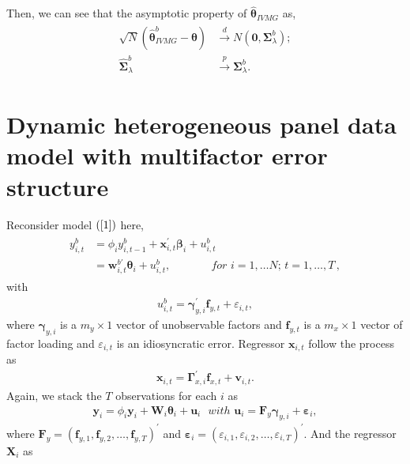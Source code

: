 \documentclass[12pt,a4paper,hyperref]{article}
\begin{document}
Then, we can see that the asymptotic property of $\hat{\boldsymbol{\theta}}_{IVMG} $ as,
\begin{align}
\begin{split}
\sqrt{N}\left(\hat{\boldsymbol{\theta}}^{b}_{IVMG}-\boldsymbol{\theta}  \right)&\overset{d}{\to} N\left(\boldsymbol{0},\boldsymbol{\Sigma}^{b}_{\lambda} \right); \\
 \hat{\boldsymbol{\Sigma}}^{b}_{\lambda} & \overset{p}{\to}   \boldsymbol{\Sigma}^{b}_{\lambda}.
\end{split}
\end{align}

\section{Dynamic heterogeneous panel data model with multifactor error structure}
Reconsider model $(\ref{1})$ here,
\begin{align}
\begin{split}
y^{b}_{i,t}&=\phi_{i} y^{b}_{i,t-1}+ \boldsymbol{x}^{'}_{i,t}\boldsymbol{\beta}_{i}+u^{b}_{i,t}  \\
&= \boldsymbol{w}^{b'}_{i,t}\boldsymbol{\theta}_{i}+u^{b}_{i,t}, \,\,\,\, \,\, \,\, \,\,\,\, \,\,\,\, \,\,\,\, \,\, for\,\,i=1,\ldots N;\,t=1,\ldots,T\, , \label{m1}
\end{split}
\end{align}
with
\begin{align}
u^{b}_{i,t}=\boldsymbol{\gamma}^{'}_{y,i}\boldsymbol{f}_{y,t}+\varepsilon_{i,t}, 
\end{align}
where $\boldsymbol{\gamma}_{y,i}$ is a $m_{y} \times 1$ vector of unobservable factors and $\boldsymbol{f}_{y,t}$ is a $m_{x} \times 1$ vector of factor loading and $\varepsilon_{i,t}$ is an idiosyncratic error. 
Regressor $\boldsymbol{x}_{i,t}$ follow the process as 
\begin{align}
 \boldsymbol{x}_{i,t}=\boldsymbol{\Gamma}^{'}_{x,i}\boldsymbol{f}_{x,t}+ \boldsymbol{v}_{i,t}.
\end{align}
Again, we stack the $T$ observations for each $i$ as
\begin{align}
\boldsymbol{y}_{i}= \phi_{i} \boldsymbol{y}_{i}+\boldsymbol{W}_{i}\boldsymbol{\theta}_{i}+\boldsymbol{u}_{i}\,\,\,\, with\,\,\boldsymbol{u}_{i}=\boldsymbol{F}_{y}\boldsymbol{\gamma}_{y,i}+\boldsymbol{\varepsilon}_{i},
\end{align}
where $\boldsymbol{F}_{y}=\left( \boldsymbol{f}_{y,1}, \boldsymbol{f}_{y,2},\ldots,\boldsymbol{f}_{y,T}  \right)^{'}$ and $\boldsymbol{\varepsilon}_{i}=\left( \varepsilon_{i,1}, \varepsilon_{i,2},\ldots,\varepsilon_{i,T} \right)^{'}$. And the regressor $\boldsymbol{X}_{i}$ as
\end{document}
